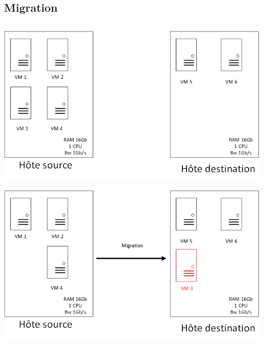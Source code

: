 \documentclass[xcolor=dvipsnames]{beamer}
\begin{document}
\subsection{Migration}
\begin{frame}
\begin{columns}
\begin{column}{0.50\textwidth}
\begin{center}
\includegraphics[scale=0.3]{migration.png}
\end{center}


\begin{center}
\includegraphics[scale=0.3]{migration2.png}
\end{center}
\end{column}
\end{columns}
\end{frame}
\end{document}
